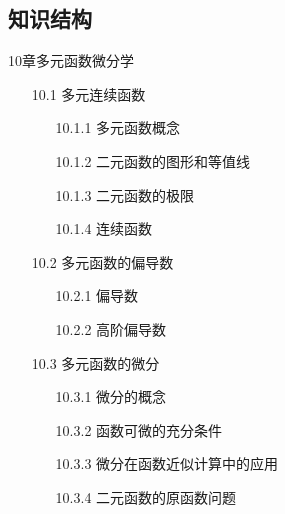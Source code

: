 \documentclass[12pt,UTF8]{ctexart}
\begin{document}
\subsection{知识结构}
10章多元函数微分学
	\begin{enumerate}
		\item[10.1]多元连续函数
		\begin{enumerate}
			\item[10.1.1]多元函数概念
			\item[10.1.2]二元函数的图形和等值线
			\item[10.1.3]二元函数的极限
			\item[10.1.4]连续函数
				\begin{itemize}
				\end{itemize}
		\end{enumerate}
		\item[10.2]多元函数的偏导数
		\begin{enumerate}
			\item[10.2.1]偏导数
			\item[10.2.2]高阶偏导数
		\end{enumerate}
		\item[10.3]多元函数的微分
		\begin{enumerate}
			\item[10.3.1]微分的概念
			\item[10.3.2]函数可微的充分条件
			\item[10.3.3]微分在函数近似计算中的应用
			\item[10.3.4]二元函数的原函数问题
		\end{enumerate}
	\end{enumerate}
\end{document}
